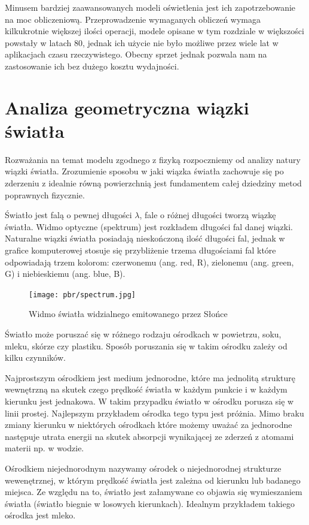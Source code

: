 \documentclass[../main.tex]{subfiles}
\begin{document}
Minusem bardziej zaawansowanych modeli oświetlenia jest ich zapotrzebowanie na
moc obliczeniową. Przeprowadzenie wymaganych obliczeń wymaga kilkukrotnie
większej ilości operacji, modele opisane w tym rozdziale w większości powstały
w latach 80, jednak ich użycie nie było możliwe przez wiele lat w aplikacjach
czasu rzeczywistego. Obecny sprzet jednak pozwala nam na zastosowanie ich bez
dużego kosztu wydajności.

\section{Analiza geometryczna wiązki światła}

Rozważania na temat modelu zgodnego z fizyką rozpoczniemy od analizy natury
wiązki światła. Zrozumienie sposobu w jaki wiązka światła zachowuje się po
zderzeniu z idealnie równą powierzchnią jest fundamentem całej dziedziny metod
poprawnych fizycznie.

Światło jest falą o pewnej długości $\lambda$, fale o różnej długości tworzą
wiązkę światła. Widmo optyczne (spektrum) jest rozkładem długości fal danej
wiązki. Naturalne wiązki światła posiadają nieskończoną ilość długości fal,
jednak w grafice komputerowej stosuje się przybliżenie trzema długościami fal
które odpowiadają trzem kolorom: czerwonemu (ang. red, R), zielonemu (ang.
green, G) i niebieskiemu (ang. blue, B).

\begin{figure}[ht]
  \centering
  \texttt{[image: pbr/spectrum.jpg]}
  \caption{Widmo światła widzialnego emitowanego przez Słońce}
\end{figure}

Światło może poruszać się w różnego rodzaju ośrodkach w powietrzu, soku, mleku,
skórze czy plastiku. Sposób poruszania się w takim ośrodku zależy od kilku
czynników.

Najprostszym ośrodkiem jest medium jednorodne, które ma jednolitą strukturę
wewnętrzną na skutek czego prędkość światła w każdym punkcie i w każdym
kierunku jest jednakowa. W takim przypadku światło w ośrodku porusza się w
linii prostej. Najlepszym przykładem ośrodka tego typu jest próżnia. Mimo braku
zmiany kierunku w niektórych ośrodkach które możemy uważać za jednorodne
następuje utrata energii na skutek absorpcji wynikającej ze zderzeń z atomami
materii np. w wodzie.

Ośrodkiem niejednorodnym nazywamy ośrodek o niejednorodnej strukturze
wewenętrznej, w którym prędkość światła jest zależna od kierunku lub badanego
miejsca. Ze względu na to, światło jest załamywane co objawia się wymieszaniem
światła (światło biegnie w losowych kierunkach). Idealnym przykładem takiego
ośrodka jest mleko.
\end{document}
